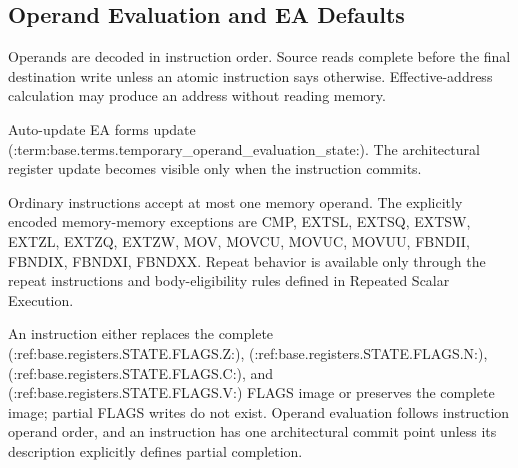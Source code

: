\subsection{Operand Evaluation and EA Defaults}
Operands are decoded in instruction order. Source reads complete before the final destination write unless an
atomic instruction says otherwise. Effective-address calculation may produce an address without reading memory.

Auto-update EA forms update (:term:base.terms.temporary_operand_evaluation_state:). The architectural register update becomes
visible only when the instruction commits.

Ordinary instructions accept at most one memory operand. The explicitly encoded memory-memory exceptions are
CMP, EXTSL, EXTSQ, EXTSW, EXTZL, EXTZQ, EXTZW, MOV, MOVCU, MOVUC, MOVUU, FBNDII, FBNDIX, FBNDXI, FBNDXX. Repeat behavior is available only through the repeat instructions and body-eligibility
rules defined in Repeated Scalar Execution.

An instruction either replaces the complete (:ref:base.registers.STATE.FLAGS.Z:), (:ref:base.registers.STATE.FLAGS.N:), (:ref:base.registers.STATE.FLAGS.C:), and (:ref:base.registers.STATE.FLAGS.V:) FLAGS image or preserves the complete image; partial FLAGS
writes do not exist. Operand evaluation follows
instruction operand order, and an instruction has one architectural commit point unless its description explicitly
defines partial completion.
